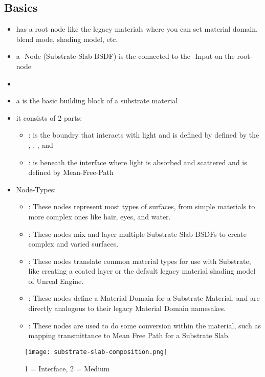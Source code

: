         \subsection{Basics}
            \begin{itemize}
                \item has a root node like the legacy materials where you can set material domain, blend mode, shading model, etc.
                \item a -Node (Substrate-Slab-BSDF) is the connected to the -Input on the root-node
                \item  
                \item a  is the basic building block of a substrate material
                \item it consists of 2 parts:
                \begin{itemize}
                    \item {}: is the boundry that interacts with light and is defined by defined by the , ,  ,  and  
                    \item {}: is beneath the interface where light is absorbed and scattered and is defined by Mean-Free-Path
                \end{itemize}
                \item Node-Types:
                \begin{itemize}
                    \item {}: These nodes represent most types of surfaces, from simple materials to more complex ones like hair, eyes, and water.
                    \item {}: These nodes mix and layer multiple Substrate Slab BSDFs to create complex and varied surfaces.
                    \item {}: These nodes translate common material types for use with Substrate, like creating a coated layer or the default legacy material shading model of Unreal Engine.
                    \item {}: These nodes define a Material Domain for a Substrate Material, and are directly analogous to their legacy Material Domain namesakes.
                    \item {}: These nodes are used to do some conversion within the material, such as mapping transmittance to Mean Free Path for a Substrate Slab.
                \end{itemize}
            \end{itemize}
            \begin{figure}
                \texttt{[image: substrate-slab-composition.png]}
                \caption{1 = Interface, 2 = Medium}
                \label{}
            \end{figure}
            
